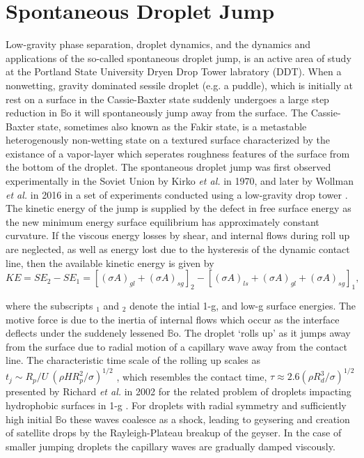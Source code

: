 \documentclass[12pt,a4paper,oneside]{book}
\begin{document}
\section{Spontaneous Droplet Jump}
Low-gravity phase separation, droplet dynamics, and the dynamics and applications of the so-called spontaneous droplet jump, is an active area of study at the Portland State University Dryen Drop Tower labratory (DDT). When a nonwetting, gravity dominated sessile droplet (e.g. a puddle), which is initially at rest on a surface in the Cassie-Baxter state suddenly undergoes a large step reduction in $\mathbb{B}\mbox{o}$ it will spontaneously jump away from the surface. The Cassie-Baxter state, sometimes also known as the Fakir state, is a metastable heterogenously non-wetting state on a textured surface characterized by the existance of a vapor-layer which seperates roughness features of the surface from the bottom of the droplet. The spontaneous droplet jump was first observed experimentally in the Soviet Union by Kirko \emph{et al.} \cite{kirko_phenomenon_1970} in 1970, and later by Wollman \emph{et al.} in 2016 in a set of experiments conducted using a low-gravity drop tower \cite{wollman_more_2016}. The kinetic energy of the jump is supplied by the defect in free surface energy as the new minimum energy surface equilibrium has approximately constant curvature. If the viscous energy losses by shear, and internal flows during roll up are neglected, as well as energy lost due to the hysteresis of the dynamic contact line, then the available kinetic energy is given by
\[KE = SE_2 -SE_1 = [(\sigma A)_{gl} + (\sigma A)_{sg}]_2 - [(\sigma A)_{ls} + (\sigma A)_{gl} + (\sigma A)_{sg}]_1, \]

where the subscripts $_1$ and $_2$ denote the intial 1-g, and low-g surface energies. The motive force is due to the inertia of internal flows which occur as the interface deflects under the suddenely lessened $\mathbb{B}\mbox{o}$. The droplet `rolls up' as it jumps away from the surface due to radial motion of a capillary wave away from the contact line. The characteristic time scale of the rolling up scales as $t_j \sim R_p/U ~(\rho H R^2_p/\sigma)^{1/2}$ \cite{attari_puddle_2016}, which resembles the contact time, $\tau \approx 2.6(\rho R^3_d/\sigma)^{1/2}$ presented by Richard \emph{et al.} in 2002 for the related problem of droplets impacting hydrophobic surfaces in 1-g \cite{richard_surface_2002}. For droplets with radial symmetry and sufficiently high initial $\mathbb{B}\mbox{o}$ these waves coalesce as a shock, leading to geysering and creation of satellite drops by the Rayleigh-Plateau breakup of the geyser. In the case of smaller jumping droplets the capillary waves are gradually damped viscously.
\end{document}
